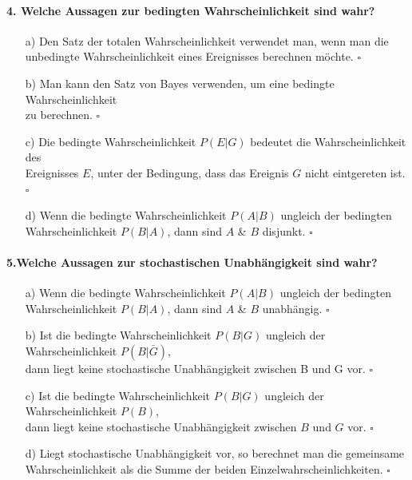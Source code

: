 \documentclass[a4paper]{article}
\begin{document}
\paragraph{4. Welche Aussagen zur bedingten Wahrscheinlichkeit sind wahr?}
\begin{itemize}
    \item[a)] Den Satz der totalen Wahrscheinlichkeit verwendet man, wenn man die \\unbedingte Wahrscheinlichkeit eines Ereignisses berechnen möchte. \hfill $\square$
    \item[b)] Man kann den Satz von Bayes verwenden, um eine bedingte Wahrscheinlichkeit\\ zu berechnen. \hfill $\square$
    \item[c)] Die bedingte Wahrscheinlichkeit $P(E|G)$ bedeutet die Wahrscheinlichkeit des\\ Ereignisses $E$, unter der Bedingung, dass das Ereignis $G$ nicht eintgereten ist. \hfill $\square$
    \item[d)] Wenn die bedingte Wahrscheinlichkeit $P(A|B)$ ungleich der bedingten\\Wahrscheinlichkeit $P(B|A)$, dann sind $A$ \& $B$ disjunkt. \hfill $\square$
\end{itemize}

\paragraph{5.Welche Aussagen zur stochastischen Unabhängigkeit sind wahr?}
\begin{itemize}
    \item[a)] Wenn die bedingte Wahrscheinlichkeit $P(A|B)$ ungleich der bedingten\\Wahrscheinlichkeit $P(B|A)$, dann sind $A$ \& $B$ unabhängig. \hfill $\square$
    \item[b)] Ist die bedingte Wahrscheinlichkeit $P(B|G)$ ungleich der Wahrscheinlichkeit $P(B|\bar G)$, \\dann liegt keine stochastische Unabhängigkeit zwischen B und G vor. \hfill $\square$
    \item[c)] Ist die bedingte Wahrscheinlichkeit $P(B|G)$ ungleich der Wahrscheinlichkeit $P(B)$, \\dann liegt keine stochastische Unabhängigkeit zwischen $B$ und $G$ vor. \hfill $\square$
    \item[d)] Liegt stochastische Unabhängigkeit vor, so berechnet man die gemeinsame\\ Wahrscheinlichkeit als die Summe der beiden Einzelwahrscheinlichkeiten. \hfill $\square$
\end{itemize}
\end{document}
